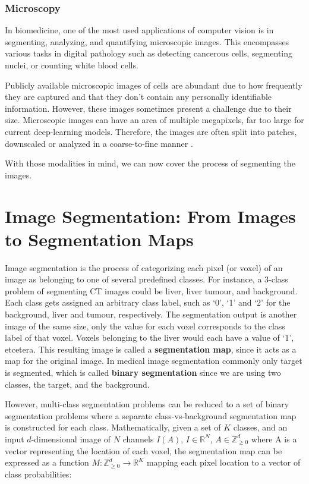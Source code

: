 \subsubsection{Microscopy}

In biomedicine, one of the most used applications of computer vision is in segmenting, analyzing, and quantifying microscopic images. This encompasses various tasks in digital pathology such as detecting cancerous cells, segmenting nuclei, or counting white blood cells.

Publicly available microscopic images of cells are abundant due to how frequently they are captured and that they don't contain any personally identifiable information. However, these images sometimes present a challenge due to their size. Microscopic images can have an area of multiple megapixels, far too large for current deep-learning models. Therefore, the images are often split into patches, downscaled or analyzed in a coarse-to-fine manner \cite{jhaInstanceSegmentationWhole2021a}.

With those modalities in mind, we can now cover the process of segmenting the images.

\section{Image Segmentation: From Images to Segmentation Maps}

Image segmentation is the process of categorizing each pixel (or voxel) of an image as belonging to one of several predefined classes. For instance, a 3-class problem of segmenting CT images could be liver, liver tumour, and background. Each class gets assigned an arbitrary class label, such as `0', `1' and `2' for the background, liver and tumour, respectively. The segmentation output is another image of the same size, only the value for each voxel corresponds to the class label of that voxel. Voxels belonging to the liver would each have a value of `1', etcetera. This resulting image is called a \textbf{segmentation map}, since it acts as a map for the original image. In medical image segmentation commonly only target is segmented, which is called \textbf{binary segmentation} since we are using two classes, the target, and the background.

However, multi-class segmentation problems can be reduced to a set of binary segmentation problems where a separate class-vs-background segmentation map is constructed for each class. Mathematically, given a set of $K$ classes, and an input $d$-dimensional image of $N$ channels $I(A)$, $I \in \mathbb{R}^{N}$, $A \in \mathbb{Z}_{\geq0}^d$ where A is a vector representing the location of each voxel, the segmentation map can be expressed as a function $M : \mathbb{Z}_{\geq0}^d \rightarrow \mathbb{R}^K$ mapping each pixel location to a vector of class probabilities:

